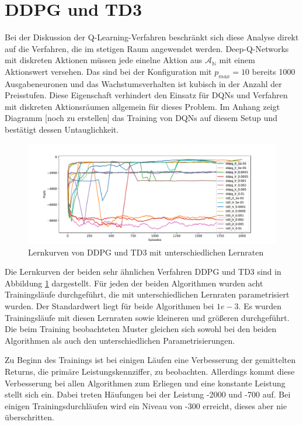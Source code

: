 \section{DDPG und TD3}
\label{section:main_ddpg}
Bei der Diskussion der Q-Learning-Verfahren beschränkt sich diese Analyse direkt auf die Verfahren, die im stetigen Raum angewendet werden.
Deep-Q-Networks mit diskreten Aktionen müssen jede einelne Aktion aus $\mathcal{A_\mathbb{N}}$ mit einem Aktionswert versehen.
Das sind bei der Konfiguration mit $p_{max}=10$ bereits 1000 Ausgabeneuronen und das Wachstumsverhalten ist kubisch in der Anzahl der Preisstufen.
Diese Eigenschaft verhindert den Einsatz für DQNs und Verfahren mit diskreten Aktionsräumen allgemein für dieses Problem.
Im Anhang zeigt Diagramm [noch zu erstellen] das Training von DQNs auf diesem Setup und bestätigt dessen Untauglichkeit.

\begin{figure}[htbp]
	\centering
	\includegraphics[width=\textwidth]{main/DDPG_learning_curve.pdf}
	\caption{Lernkurven von DDPG und TD3 mit unterschiedlichen Lernraten}
	\label{grafic:DDPGLearningCurve}
\end{figure}

Die Lernkurven der beiden sehr ähnlichen Verfahren DDPG und TD3 sind in Abbildung \ref{grafic:DDPGLearningCurve} dargestellt.
Für jeden der beiden Algorithmen wurden acht Trainingsläufe durchgeführt, die mit unterschiedlichen Lernraten parametrisiert wurden.
Der Standardwert liegt für beide Algorithmen bei $1e-3$.
Es wurden Trainingsläufe mit diesen Lernraten sowie kleineren und größeren durchgeführt.
Die beim Training beobachteten Muster gleichen sich sowohl bei den beiden Algorithmen als auch den unterschiedlichen Parametrisierungen.

Zu Beginn des Trainings ist bei einigen Läufen eine Verbesserung der gemittelten Returns, die primäre Leistungskennziffer, zu beobachten.
Allerdings kommt diese Verbesserung bei allen Algorithmen zum Erliegen und eine konstante Leistung stellt sich ein.
Dabei treten Häufungen bei der Leistung -2000 und -700 auf.
Bei einigen Trainingsdurchläufen wird ein Niveau von -300 erreicht, dieses aber nie überschritten.

